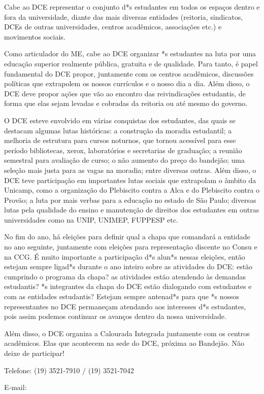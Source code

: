 Cabe ao DCE representar o conjunto d*s estudantes em todos os espaços dentro e
fora da universidade, diante das mais diversas entidades (reitoria, sindicatos,
DCEs de outras universidades, centros acadêmicos, associações etc.) e
movimentos sociais.

Como articulador do ME, cabe ao DCE organizar *s estudantes na luta por uma
educação superior realmente pública, gratuita e de qualidade. Para tanto, é
papel fundamental do DCE propor, juntamente com os centros acadêmicos,
discussões políticas que extrapolem os nossos currículos e o nosso dia a dia.
Além disso, o DCE deve propor ações que vão ao encontro das reivindicações
estudantis, de forma que elas sejam levadas e cobradas da reitoria ou até mesmo
do governo.

O DCE esteve envolvido em várias conquistas dos estudantes, das quais se
destacam algumas lutas históricas: a construção da moradia estudantil; a
melhoria de estrutura para cursos noturnos, que tornou acessível para esse
período bibliotecas, xerox, laboratórios e secretarias de graduação; a reunião
semestral para avaliação de curso; o não aumento do preço do bandejão; uma
seleção mais justa para as vagas na moradia; entre diversas outras. Além disso,
o DCE teve participação em importantes lutas sociais que extrapolam o âmbito da
Unicamp, como a organização do Plebiscito contra a Alca e do Plebiscito contra
o Provão; a luta por mais verbas para a educação no estado de São Paulo;
diversas lutas pela qualidade do ensino e manutenção de direitos dos estudantes
em outras universidades como na UNIP, UNIMEP, FUPPESP etc.

No fim do ano, há eleições para definir qual a chapa que comandará a entidade
no ano seguinte, juntamente com eleições para representação discente no Consu e
na CCG. É muito importante a participação d*s alun*s nessas eleições, então
estejam sempre ligad*s durante o ano inteiro sobre as atividades do DCE: estão
cumprindo o programa da chapa? as atividades estão atendendo às demandas
estudantis?  *s integrantes da chapa do DCE estão dialogando com estudantes e
com as entidades estudantis?  Estejam sempre antenad*s para que *s nossos
representantes no DCE permaneçam atendando aos interesses d*s estudantes, pois
assim podemos continuar os avanços dentro da nossa universidade.

Além disso, o DCE organiza a Calourada Integrada juntamente com os centros
acadêmicos. Elas que acontecem na sede do DCE, próxima ao Bandejão. Não deixe
de participar!

\begin{compactitemize}
\item Telefone: (19) 3521-7910 / (19) 3521-7042
\item E-mail: 
\end{compactitemize}

